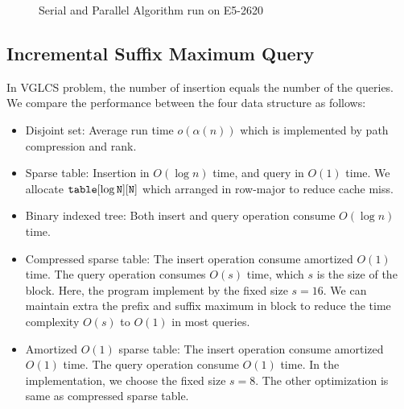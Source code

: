 \iffalse
我們運行優化策略中的空間壓縮版本，而非理論分析的 $\theta(1)$ 操作，
單次詢問落在 $O(s)$ 中，在實作上由於可以完全壓在暫存器上操作，效能表現較佳。
\fi

\begin{figure}[!thb]
  \centering
  \caption{Serial and Parallel Algorithm run on E5-2620}
\end{figure}



\subsection{Incremental Suffix Maximum Query}

In VGLCS problem, the number of insertion equals the number of the
queries. We compare the performance between the four data structure as
follows:

\iffalse
針對插入和詢問次數相同的 ISMQ 問題，運行以下四種數據結構：
\fi

\begin{itemize}
  \item 

Disjoint set: Average run time $o(\alpha(n))$ which is implemented by
path compression and rank.

  \item 

Sparse table: Insertion in $O(\log n)$ time, and query in $O(1)$ time.
We allocate $\tt{table}[\log N][N]$ which arranged in row-major to
reduce cache miss.

  \item 

Binary indexed tree: Both insert and query operation consume $O(\log
n)$ time.

  \item 

Compressed sparse table: The insert operation consume amortized
$O(1)$ time.  The query operation consumes $O(s)$ time, which $s$ is the
size of the block.  Here, the program implement by the fixed size $s =
16$.  We can maintain extra the prefix and suffix maximum in block to
reduce the time complexity $O(s)$ to $O(1)$ in most queries.

  \item

Amortized $O(1)$ sparse table:  The insert operation consume amortized
$O(1)$ time.  The query operation consume $O(1)$ time.  In the
implementation, we choose the fixed size $s = 8$.  The other
optimization is same as compressed sparse table.

\end{itemize}

